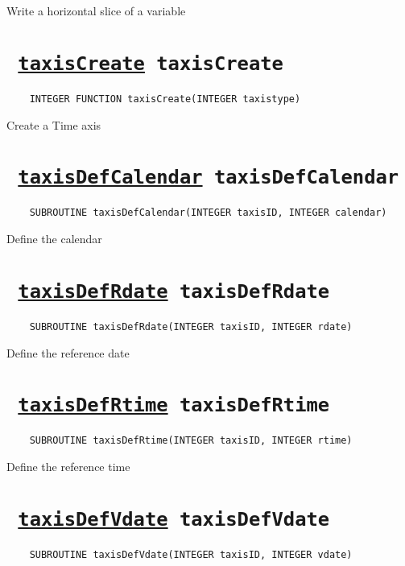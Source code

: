 Write a horizontal slice of a variable
\ifpdfoutput{}{(\ref{streamWriteVarSliceF})}


\section*{\texttt{ 
\ifpdf
\hyperref[taxisCreate]{taxisCreate}
\else
taxisCreate
\fi
}}
\begin{verbatim}
    INTEGER FUNCTION taxisCreate(INTEGER taxistype)
\end{verbatim}

Create a Time axis
\ifpdfoutput{}{(\ref{taxisCreate})}


\section*{\texttt{ 
\ifpdf
\hyperref[taxisDefCalendar]{taxisDefCalendar}
\else
taxisDefCalendar
\fi
}}
\begin{verbatim}
    SUBROUTINE taxisDefCalendar(INTEGER taxisID, INTEGER calendar)
\end{verbatim}

Define the calendar
\ifpdfoutput{}{(\ref{taxisDefCalendar})}


\section*{\texttt{ 
\ifpdf
\hyperref[taxisDefRdate]{taxisDefRdate}
\else
taxisDefRdate
\fi
}}
\begin{verbatim}
    SUBROUTINE taxisDefRdate(INTEGER taxisID, INTEGER rdate)
\end{verbatim}

Define the reference date
\ifpdfoutput{}{(\ref{taxisDefRdate})}


\section*{\texttt{ 
\ifpdf
\hyperref[taxisDefRtime]{taxisDefRtime}
\else
taxisDefRtime
\fi
}}
\begin{verbatim}
    SUBROUTINE taxisDefRtime(INTEGER taxisID, INTEGER rtime)
\end{verbatim}

Define the reference time
\ifpdfoutput{}{(\ref{taxisDefRtime})}


\section*{\texttt{ 
\ifpdf
\hyperref[taxisDefVdate]{taxisDefVdate}
\else
taxisDefVdate
\fi
}}
\begin{verbatim}
    SUBROUTINE taxisDefVdate(INTEGER taxisID, INTEGER vdate)
\end{verbatim}

